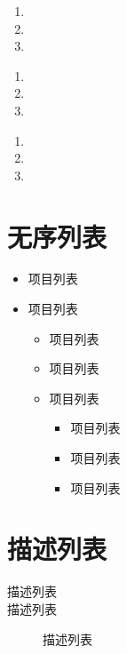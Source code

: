 \begin{enumerate}[{\bf 第}1{\bf 条}]
    \item \aaa
    \item \aaa
    \item \aaa
\end{enumerate}

\begin{enumerate}[a]
    \item \aaa
    \item \aaa
    \item \aaa
\end{enumerate}

\begin{enumerate}[I]
    \item \aaa
    \item \aaa
    \item \aaa
\end{enumerate}

\section{无序列表 \label{chap4:chap3:wubianhao}}

\begin{itemize}
\item {项目列表}
\item {项目列表}
    \begin{itemize}
    \item {项目列表}
    \item {项目列表}
    \item {项目列表}
        \begin{itemize}
        \item {项目列表}
        \item {项目列表}
        \item {项目列表}
        \end{itemize}
    \end{itemize}
\end{itemize}

\section{描述列表 \label{chap4:chap4:description}}

\begin{description}
    \item[描述列表] \aaa
    \item[描述列表] 描述列表
 \end{description}



